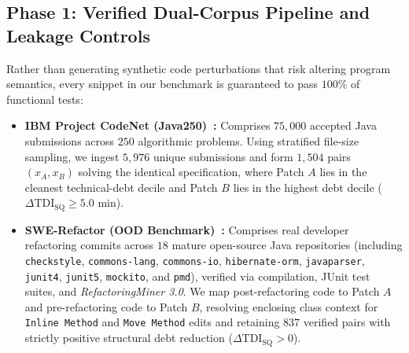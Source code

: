 \documentclass[conference]{IEEEtran}
\begin{document}
\subsection{Phase 1: Verified Dual-Corpus Pipeline and Leakage Controls}
Rather than generating synthetic code perturbations that risk altering program semantics, every snippet in our benchmark is guaranteed to pass $100\%$ of functional tests:
\begin{itemize}
    \item \textbf{IBM Project CodeNet (Java250)~\cite{puri2021codenet}:} Comprises $75{,}000$ accepted Java submissions across $250$ algorithmic problems. Using stratified file-size sampling, we ingest $5{,}976$ unique submissions and form $1{,}504$ pairs $(x_A, x_B)$ solving the identical specification, where Patch $A$ lies in the cleanest technical-debt decile and Patch $B$ lies in the highest debt decile ($\Delta \text{TDI}_{\text{SQ}} \ge 5.0\text{ min}$).
    \item \textbf{SWE-Refactor (OOD Benchmark)~\cite{swerefactor2025}:} Comprises real developer refactoring commits across $18$ mature open-source Java repositories (including \texttt{checkstyle}, \texttt{commons-lang}, \texttt{commons-io}, \texttt{hibernate-orm}, \texttt{javaparser}, \texttt{junit4}, \texttt{junit5}, \texttt{mockito}, and \texttt{pmd}), verified via compilation, JUnit test suites, and \textit{RefactoringMiner 3.0}. We map post-refactoring code to Patch $A$ and pre-refactoring code to Patch $B$, resolving enclosing class context for \texttt{Inline Method} and \texttt{Move Method} edits and retaining $837$ verified pairs with strictly positive structural debt reduction ($\Delta \text{TDI}_{\text{SQ}} > 0$).
\end{itemize}
\end{document}
